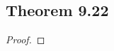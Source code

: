 \documentclass[../../main.tex]{subfiles}
\begin{document}
\subsection{Theorem 9.22}
\begin{wts}

\end{wts}
\begin{proof}

\end{proof}
\end{document}
